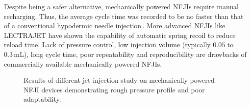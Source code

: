         Despite being a safer alternative, mechanically powered \acsp{NFJI} require manual recharging. Thus, the average cycle time was recorded to be no faster than that of a conventional hypodermic needle injection\,\cite{PharmaJet2011}. More advanced \acsp{NFJI} like LECTRAJET  have shown the capability of automatic spring recoil to reduce reload time. Lack of pressure control, low injection volume (typically $0.05$ to $0.3\,\mathrm{mL}$), long cycle time, poor repeatability and reproducibility are drawbacks of commercially available mechanically powered \acsp{NFJI}.
        
        \begin{figure}[!ht]
            \centering
            \qquad
            \caption{
                Results of different jet injection study on mechanically powered \acs{NFJI} devices demonstrating rough pressure profile and poor adaptability.
            }   \label{fig:chapter/background/jet injection effectiveness}
        \end{figure}


